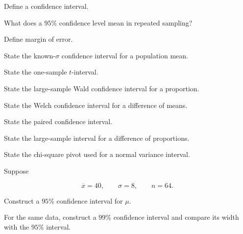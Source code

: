 \begin{exercise}[1]
Define a confidence interval.
\end{exercise}

\begin{exercise}[1]
What does a \(95\%\) confidence level mean in repeated sampling?
\end{exercise}

\begin{exercise}[1]
Define margin of error.
\end{exercise}

\begin{exercise}[1]
State the known-\(\sigma\) confidence interval for a population mean.
\end{exercise}

\begin{exercise}[1]
State the one-sample \(t\)-interval.
\end{exercise}

\begin{exercise}[1]
State the large-sample Wald confidence interval for a proportion.
\end{exercise}

\begin{exercise}[1]
State the Welch confidence interval for a difference of means.
\end{exercise}

\begin{exercise}[1]
State the paired confidence interval.
\end{exercise}

\begin{exercise}[1]
State the large-sample interval for a difference of proportions.
\end{exercise}

\begin{exercise}[1]
State the chi-square pivot used for a normal variance interval.
\end{exercise}

\begin{exercise}[2]
Suppose

\[
\overline{x}=40,
\qquad
\sigma=8,
\qquad
n=64.
\]

Construct a \(95\%\) confidence interval for \(\mu\).
\end{exercise}

\begin{exercise}[2]
For the same data, construct a \(99\%\) confidence interval and compare
its width with the \(95\%\) interval.
\end{exercise}

